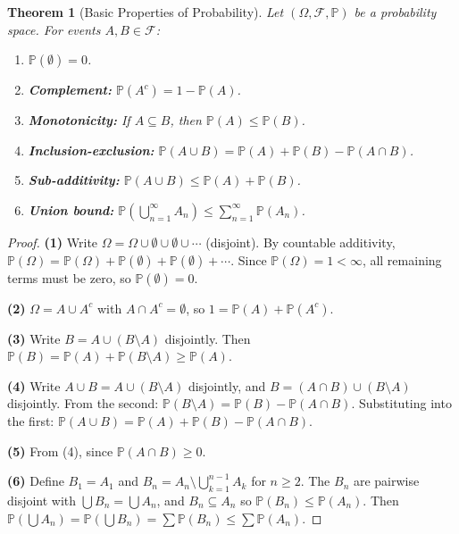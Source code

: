\documentclass[11pt,a4paper]{article}
\theoremstyle{definition}
\theoremstyle{plain}
\newtheorem{theorem}{Theorem}[section]
\theoremstyle{remark}
\newcommand{\Prob}{\mathbb{P}}
\begin{document}
\begin{theorem}[Basic Properties of Probability]
\label{thm:prob_props}
Let $(\Omega, \mathcal{F}, \Prob)$ be a probability space. For events $A, B \in \mathcal{F}$:
\begin{enumerate}[nosep]
    \item $\Prob(\emptyset) = 0$.
    \item \textbf{Complement:} $\Prob(A^c) = 1 - \Prob(A)$.
    \item \textbf{Monotonicity:} If $A \subseteq B$, then $\Prob(A) \leq \Prob(B)$.
    \item \textbf{Inclusion-exclusion:} $\Prob(A \cup B) = \Prob(A) + \Prob(B) - \Prob(A \cap B)$.
    \item \textbf{Sub-additivity:} $\Prob(A \cup B) \leq \Prob(A) + \Prob(B)$.
    \item \textbf{Union bound:} $\Prob\!\left(\bigcup_{n=1}^\infty A_n\right) \leq \sum_{n=1}^\infty \Prob(A_n)$.
\end{enumerate}
\end{theorem}

\begin{proof}
\textbf{(1)} Write $\Omega = \Omega \cup \emptyset \cup \emptyset \cup \cdots$ (disjoint). By countable additivity, $\Prob(\Omega) = \Prob(\Omega) + \Prob(\emptyset) + \Prob(\emptyset) + \cdots$. Since $\Prob(\Omega) = 1 < \infty$, all remaining terms must be zero, so $\Prob(\emptyset) = 0$.

\textbf{(2)} $\Omega = A \cup A^c$ with $A \cap A^c = \emptyset$, so $1 = \Prob(A) + \Prob(A^c)$.

\textbf{(3)} Write $B = A \cup (B \setminus A)$ disjointly. Then $\Prob(B) = \Prob(A) + \Prob(B \setminus A) \geq \Prob(A)$.

\textbf{(4)} Write $A \cup B = A \cup (B \setminus A)$ disjointly, and $B = (A \cap B) \cup (B \setminus A)$ disjointly. From the second: $\Prob(B \setminus A) = \Prob(B) - \Prob(A \cap B)$. Substituting into the first: $\Prob(A \cup B) = \Prob(A) + \Prob(B) - \Prob(A \cap B)$.

\textbf{(5)} From (4), since $\Prob(A \cap B) \geq 0$.

\textbf{(6)} Define $B_1 = A_1$ and $B_n = A_n \setminus \bigcup_{k=1}^{n-1} A_k$ for $n \geq 2$. The $B_n$ are pairwise disjoint with $\bigcup B_n = \bigcup A_n$, and $B_n \subseteq A_n$ so $\Prob(B_n) \leq \Prob(A_n)$. Then $\Prob(\bigcup A_n) = \Prob(\bigcup B_n) = \sum \Prob(B_n) \leq \sum \Prob(A_n)$.
\end{proof}
\end{document}
